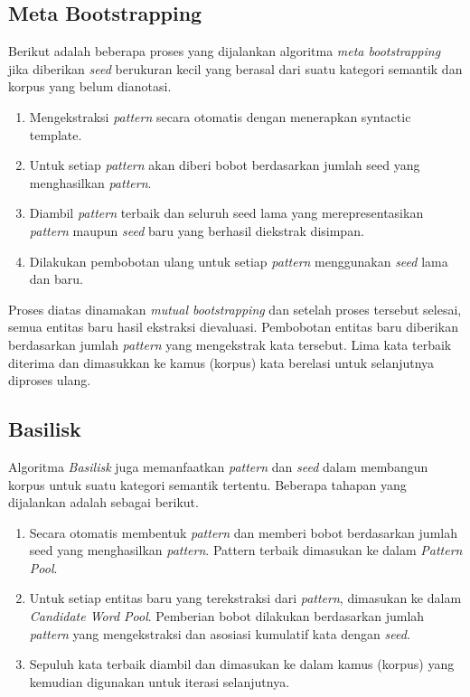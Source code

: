 \subsection{Meta Bootstrapping}
Berikut adalah beberapa proses \citep{riloff1999learning} yang dijalankan algoritma \textit{meta bootstrapping} jika diberikan \textit{seed} berukuran kecil yang berasal dari suatu kategori semantik dan korpus yang belum dianotasi.
\begin{enumerate}
  \item Mengekstraksi \textit{pattern} secara otomatis dengan menerapkan syntactic template.
  \item Untuk setiap \textit{pattern} akan diberi bobot berdasarkan jumlah seed yang menghasilkan \textit{pattern}.
  \item Diambil \textit{pattern} terbaik dan seluruh seed lama yang merepresentasikan \textit{pattern} maupun \textit{seed} baru yang berhasil diekstrak disimpan.
  \item Dilakukan pembobotan ulang untuk setiap \textit{pattern} menggunakan \textit{seed} lama dan baru.
\end{enumerate}
Proses diatas dinamakan \textit{mutual bootstrapping} dan setelah proses tersebut selesai, semua entitas baru hasil ekstraksi dievaluasi. Pembobotan entitas baru diberikan berdasarkan jumlah \textit{pattern} yang mengekstrak kata tersebut. Lima kata terbaik diterima dan dimasukkan ke kamus (korpus) kata berelasi untuk selanjutnya diproses ulang.

\subsection{Basilisk}
Algoritma \textit{Basilisk} \citep{thelen2002bootstrapping} juga memanfaatkan \textit{pattern} dan \textit{seed} dalam membangun korpus untuk suatu kategori semantik tertentu. Beberapa tahapan yang dijalankan adalah sebagai berikut.
\begin{enumerate}
  \item Secara otomatis membentuk \textit{pattern} dan memberi bobot berdasarkan jumlah seed yang menghasilkan \textit{pattern}. Pattern terbaik dimasukan ke dalam \textit{Pattern Pool}.
  \item Untuk setiap entitas baru yang terekstraksi dari \textit{pattern}, dimasukan ke dalam \textit{Candidate Word Pool}. Pemberian bobot dilakukan berdasarkan jumlah \textit{pattern} yang mengekstraksi dan asosiasi kumulatif kata dengan \textit{seed}.
  \item Sepuluh kata terbaik diambil dan dimasukan ke dalam kamus (korpus) yang kemudian digunakan untuk iterasi selanjutnya. 
\end{enumerate}


